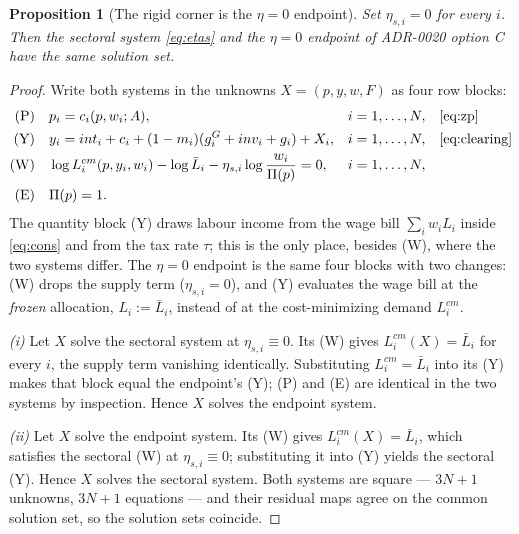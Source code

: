 \documentclass[11pt]{article}
\newtheorem{proposition}{Proposition}
\numberwithin{equation}{section}
\begin{document}
{\begin{proposition}[The rigid corner is the $\eta = 0$ endpoint]\label{prop:nest}
Set $\eta_{s,i} = 0$ for every $i$. Then the sectoral system \eqref{eq:etas}
and the $\eta = 0$ endpoint of ADR-0020 option C have the same solution set.
\end{proposition}

\begin{proof}
Write both systems in the unknowns $X = (p, y, w, F)$ as four row blocks:
\begin{align*}
\text{(P)} \quad & p_i = c_i(p, w_i; A), & & i = 1,\dots,N,
   & & \text{\eqref{eq:zp}} \\
\text{(Y)} \quad & y_i = int_i + c_i + (1-m_i)(g^G_i + inv_i + g_i) + X_i,
   & & i = 1,\dots,N, & & \text{\eqref{eq:clearing}} \\
\text{(W)} \quad & \log L^{cm}_i(p,y_i,w_i) - \log \bar{L}_i
   - \eta_{s,i} \log \frac{w_i}{\Pi(p)} = 0, & & i = 1,\dots,N, & & \\
\text{(E)} \quad & \Pi(p) = 1. & & & &
\end{align*}
The quantity block (Y) draws labour income from the wage bill
$\sum_i w_i L_i$ inside \eqref{eq:cons} and from the tax rate $\tau$; this is
the only place, besides (W), where the two systems differ. The $\eta = 0$
endpoint is the same four blocks with two changes: (W) drops the supply term
($\eta_{s,i} = 0$), and (Y) evaluates the wage bill at the \emph{frozen}
allocation, $L_i := \bar{L}_i$, instead of at the cost-minimizing demand
$L^{cm}_i$.

\emph{(i)} Let $X$ solve the sectoral system at $\eta_{s,i} \equiv 0$. Its (W)
gives $L^{cm}_i(X) = \bar{L}_i$ for every $i$, the supply term vanishing
identically. Substituting $L^{cm}_i = \bar{L}_i$ into its (Y) makes that block
equal the endpoint's (Y); (P) and (E) are identical in the two systems by
inspection. Hence $X$ solves the endpoint system.

\emph{(ii)} Let $X$ solve the endpoint system. Its (W) gives
$L^{cm}_i(X) = \bar{L}_i$, which satisfies the sectoral (W) at
$\eta_{s,i} \equiv 0$; substituting it into (Y) yields the sectoral (Y). Hence
$X$ solves the sectoral system. Both systems are square --- $3N+1$ unknowns,
$3N+1$ equations --- and their residual maps agree on the common solution set,
so the solution sets coincide.
\end{proof}

}
\end{document}
